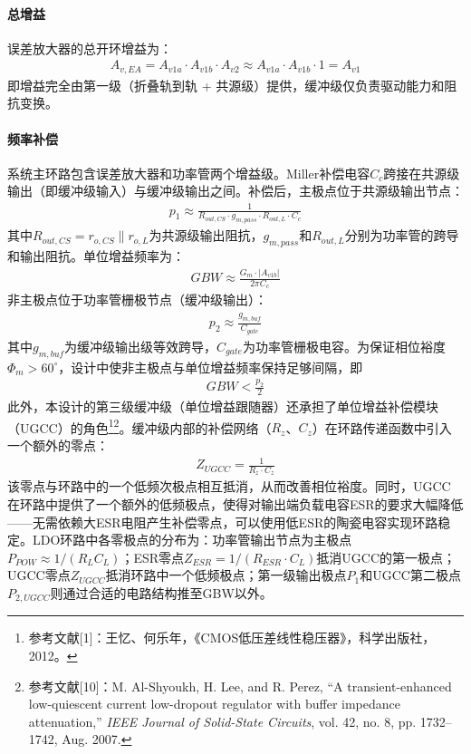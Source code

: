 \documentclass[a4paper, 12pt]{article}
\newcommand{\fnHeLDO}{\footnote{参考文献[1]：王忆、何乐年，《CMOS低压差线性稳压器》，科学出版社，2012。}}
\newcommand{\fnAlShyoukh}{\footnote{参考文献[10]：M. Al-Shyoukh, H. Lee, and R. Perez, ``A transient-enhanced low-quiescent current low-dropout regulator with buffer impedance attenuation,'' \textit{IEEE Journal of Solid-State Circuits}, vol. 42, no. 8, pp. 1732--1742, Aug. 2007.}}
\begin{document}
\paragraph{总增益}

误差放大器的总开环增益为：
\begin{gather}
  A_{v,EA} = A_{v1a} \cdot A_{v1b} \cdot A_{v2}
    \approx A_{v1a} \cdot A_{v1b} \cdot 1 = A_{v1}
\end{gather}
即增益完全由第一级（折叠轨到轨 + 共源级）提供，缓冲级仅负责驱动能力和阻抗变换。

\paragraph{频率补偿}

系统主环路包含误差放大器和功率管两个增益级。Miller补偿电容$C_c$跨接在共源级输出（即缓冲级输入）与缓冲级输出之间。补偿后，主极点位于共源级输出节点：
\begin{gather}
  p_1 \approx \frac{1}{R_{out,CS} \cdot g_{m,pass} \cdot R_{out,L} \cdot C_c}
\end{gather}
其中$R_{out,CS} = r_{o,CS} \| r_{o,L}$为共源级输出阻抗，$g_{m,pass}$和$R_{out,L}$分别为功率管的跨导和输出阻抗。单位增益频率为：
\begin{gather}
  GBW \approx \frac{G_m \cdot |A_{v1b}|}{2\pi C_c}
\end{gather}
非主极点位于功率管栅极节点（缓冲级输出）：
\begin{gather}
  p_2 \approx \frac{g_{m,buf}}{C_{gate}}
\end{gather}
其中$g_{m,buf}$为缓冲级输出级等效跨导，$C_{gate}$为功率管栅极电容。为保证相位裕度$\Phi_m>60^\circ$，设计中使非主极点与单位增益频率保持足够间隔，即
\begin{gather}
  GBW < \frac{p_2}{2}
\end{gather}
此外，本设计的第三级缓冲级（单位增益跟随器）还承担了单位增益补偿模块（UGCC）的角色\fnHeLDO\fnAlShyoukh。缓冲级内部的补偿网络（$R_z$、$C_z$）在环路传递函数中引入一个额外的零点：
\begin{gather}
  Z_{UGCC} = \frac{1}{R_z \cdot C_z}
\end{gather}
该零点与环路中的一个低频次极点相互抵消，从而改善相位裕度。同时，UGCC 在环路中提供了一个额外的低频极点，使得对输出端负载电容ESR的要求大幅降低——无需依赖大ESR电阻产生补偿零点，可以使用低ESR的陶瓷电容实现环路稳定。LDO环路中各零极点的分布为：功率管输出节点为主极点$P_{POW} \approx 1/(R_L C_L)$；ESR零点$Z_{ESR} = 1/(R_{ESR} \cdot C_L)$抵消UGCC的第一极点；UGCC零点$Z_{UGCC}$抵消环路中一个低频极点；第一级输出极点$P_1$和UGCC第二极点$P_{2,UGCC}$则通过合适的电路结构推至GBW以外。
\end{document}
